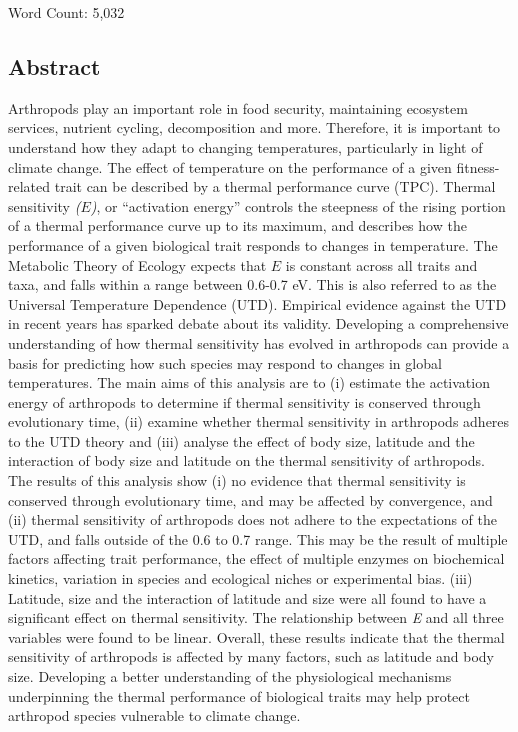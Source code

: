 \documentclass[11pt]{article}
\begin{document}
\vspace{2cm}Word Count: 5,032

\clearpage
\tableofcontents
\clearpage

\begin{flushleft}

\section{Abstract}
Arthropods play an important role in food security, maintaining ecosystem services, nutrient cycling, decomposition and more. Therefore, it is important to understand how they adapt to changing temperatures, particularly in light of climate change. The effect of temperature on the performance of a given fitness-related trait can be described by a thermal performance curve (TPC). Thermal sensitivity \emph{($E$)}, or “activation energy” controls the steepness of the rising portion of a thermal performance curve up to its maximum, and describes how the performance of a given biological trait responds to changes in temperature. The Metabolic Theory of Ecology expects that \emph{$E$} is constant across all traits and taxa, and falls within a range between 0.6-0.7 eV. This is also referred to as the Universal Temperature Dependence (UTD). Empirical evidence against the UTD in recent years has sparked debate about its validity. Developing a comprehensive understanding of how thermal sensitivity has evolved in arthropods can provide a basis for predicting how such species may respond to changes in global temperatures.
The main aims of this analysis are to (i) estimate the activation energy of arthropods to determine if thermal sensitivity is conserved through evolutionary time, (ii) examine whether thermal sensitivity in arthropods adheres to the UTD theory and (iii) analyse the effect of body size, latitude and the interaction of body size and latitude on the thermal sensitivity of arthropods. The results of this analysis show (i) no evidence that thermal sensitivity is conserved through evolutionary time, and may be affected by convergence, and (ii) thermal sensitivity of arthropods does not adhere to the expectations of the UTD, and falls outside of the 0.6 to 0.7 range. This may be the result of multiple factors affecting trait performance, the effect of multiple enzymes on biochemical kinetics, variation in species and ecological niches or experimental bias. (iii) Latitude, size and the interaction of latitude and size were all found to have a significant effect on thermal sensitivity. The relationship between \emph{E} and all three variables were found to be linear. Overall, these results indicate that the thermal sensitivity of arthropods is affected by many factors, such as latitude and body size. Developing a better understanding of the physiological mechanisms underpinning the thermal performance of biological traits may help protect arthropod species vulnerable to climate change.


\end{flushleft}
\end{document}
